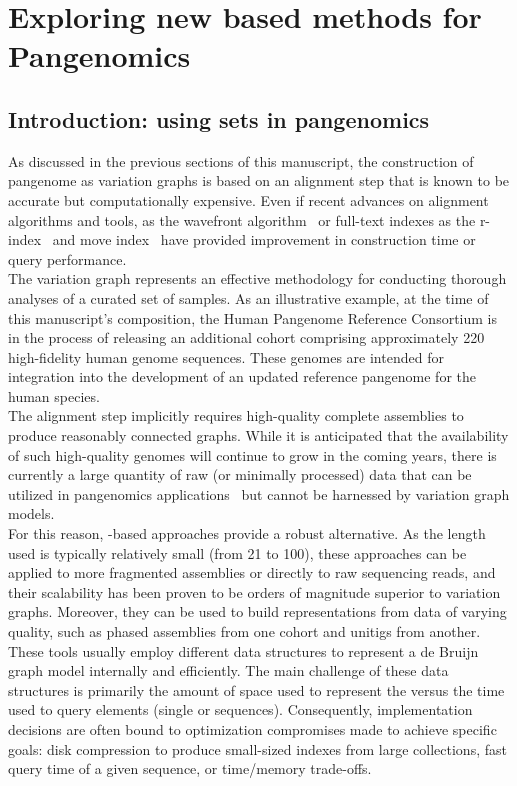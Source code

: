 \chapter{Exploring new \kmer based methods for Pangenomics} %
\label{sec:complexity}

\section{Introduction: using \kmer sets in pangenomics}%
As discussed in the previous sections of this manuscript, the construction of pangenome as variation graphs is based on an alignment step that is known to be accurate but computationally expensive. Even if recent advances on alignment algorithms and tools, as the wavefront algorithm~\cite{wavefront} or full-text indexes as the r-index~\cite{spumoni2} and move index~\cite{movi} have provided improvement in construction time or query performance.\\
The variation graph represents an effective methodology for conducting thorough analyses of a curated set of samples. As an illustrative example, at the time of this manuscript's composition, the Human Pangenome Reference Consortium is in the process of releasing an additional cohort comprising approximately 220 high-fidelity human genome sequences. These genomes are intended for integration into the development of an updated reference pangenome for the human species.\\
The alignment step implicitly requires high-quality complete assemblies to produce reasonably connected graphs. While it is anticipated that the availability of such high-quality genomes will continue to grow in the coming years, there is currently a large quantity of raw (or minimally processed) data that can be utilized in pangenomics applications~\cite{serratus,logan} but cannot be harnessed by variation graph models.\\ 
For this reason, \kmer-based approaches provide a robust alternative. As the \kmer length used is typically relatively small (from 21 to 100), these approaches can be applied to more fragmented assemblies or directly to raw sequencing reads, and their scalability has been proven to be orders of magnitude superior to variation graphs. Moreover, they can be used to build representations from data of varying quality, such as phased assemblies from one cohort and unitigs from another. These tools usually employ different data structures to represent a de Bruijn graph model internally and efficiently. The main challenge of these data structures is primarily the amount of space used to represent the \kmers versus the time used to query elements (single \kmers or sequences). Consequently, implementation decisions are often bound to optimization compromises made to achieve specific goals: disk compression to produce small-sized indexes from large collections, fast query time of a given sequence, or time/memory trade-offs.\\
